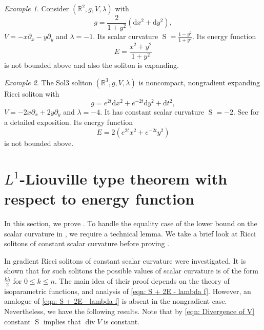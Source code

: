 \documentclass{amsart}
\newcommand{\derivative}{\mathrm{d}}
\newcommand{\brackets}[1]{\left( #1 \right)}
\DeclareMathOperator*{\scalar}{S}
\DeclareMathOperator*{\divergence}{div}
\theoremstyle{plain}
\theoremstyle{plain}
\theoremstyle{plain}
\theoremstyle{plain}
\theoremstyle{remark}
\newtheorem{example}{Example}
\begin{document}
\begin{example}
Consider    $(\mathbb{R}^2, g, V,\lambda)$   with 
    $$ g=\frac{2}{1+y^2} \brackets{ \derivative x^2 + \derivative y^2 } ,$$
    $V=-x\partial_x -y\partial_y$  and $\lambda=-1$. 
    Its scalar curvature $\scalar = \frac{1-y^2}{1+y^2}$.
    Its energy function 
    $$ E = \frac{x^2 + y^2}{1+y^2} $$
    is not bounded above and also the soliton is expanding.
\end{example}

\begin{example}
    The Sol3 soliton $(\mathbb{R}^3 ,g , V, \lambda ) $ is noncompact, nongradient expanding Ricci soliton with  
    $$ g = e^{2t} \derivative x^2 + e^{-2t} \derivative y^2 + \derivative t^2, $$
    $V= -2x \partial_x +2y\partial_y  $ and $\lambda=-4$. 
    It has constant scalar curvature $\scalar = -2$. 
    See \cite{MR4888461} for a detailed exposition.
    Its energy function 
    $$ E = 2 \left( e^{2t} x^2 + e^{-2t} y^2 \right) $$
    is not bounded above. 
\end{example}



\section{$L^1$-Liouville type theorem with respect to energy function}\label{liou}
    In this section, we prove . To handle the equality case of the lower bound on the scalar curvature in , we require a technical lemma.
    We take a brief look at Ricci solitons of constant scalar curvature before proving .

In \cite{MR3415603} gradient Ricci solitons of constant scalar curvature were investigated.  
It is shown that for such solitons the possible values of scalar curvature is of the form 
$\frac{k \lambda}{2}$ for $0\leq k \leq n$. 
The main idea of their proof depends on the theory of isoparametric functions, and analysis of \cref{eqn: S + 2E - lambda f}.
However, an analogue of  \cref{eqn: S + 2E - lambda f} is absent in the nongradient case. 
Nevertheless, we have the following results.
Note that  by \cref{eqn: Divergence of V}  constant $\scalar$ implies that  $\divergence V$ is constant.
\end{document}
